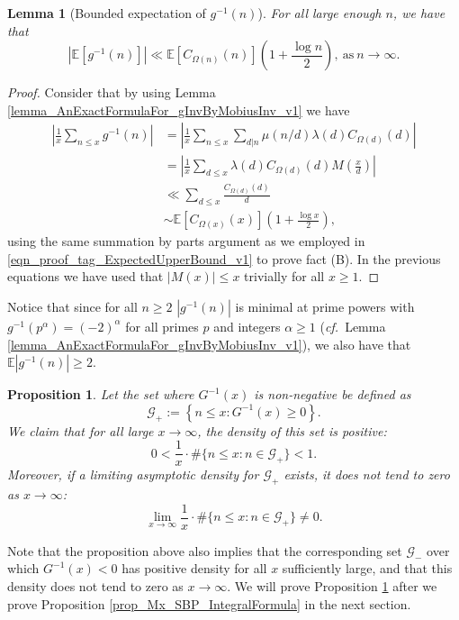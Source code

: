 \documentclass[11pt,reqno,a4letter]{article}
\numberwithin{figure}{section}
\numberwithin{table}{section}
\newcommand{\cf}{\textit{cf.\ }}
\theoremstyle{plain}
\newtheorem{prop}[theorem]{Proposition}
\newtheorem{lemma}[theorem]{Lemma}
\numberwithin{theorem}{section}
\theoremstyle{definition}
\begin{document}
\begin{lemma}[Bounded expectation of $g^{-1}(n)$] 
\label{lemma_BddExpectationOfgInvn} 
For all large enough $n$, we have that 
\[
|\mathbb{E}[g^{-1}(n)]| \ll \mathbb{E}[C_{\Omega(n)}(n)] \left( 
     1 + \frac{\log n}{2} 
     \right), \mathrm{\ as\ } n \rightarrow \infty. 
\]
\end{lemma}
\begin{proof} 
Consider that by using Lemma \ref{lemma_AnExactFormulaFor_gInvByMobiusInv_v1} we have 
\begin{align*} 
\left\lvert \frac{1}{x} \sum_{n \leq x} g^{-1}(n) \right\rvert 
     & = \left\lvert \frac{1}{x} \sum_{n \leq x} \sum_{d|n} \mu(n/d) \lambda(d) C_{\Omega(d)}(d) \right\rvert \\ 
     & = \left\lvert \frac{1}{x} \sum_{d \leq x} \lambda(d) C_{\Omega(d)}(d) M\left(\frac{x}{d}\right) \right\rvert \\ 
     & \ll \sum_{d \leq x} \frac{C_{\Omega(d)}(d)}{d} \\ 
     & \sim \mathbb{E}\left[C_{\Omega(x)}(x)\right] \left( 
     1 + \frac{\log x}{2} 
     \right),  
\end{align*} 
using the same summation by parts argument as we employed in 
\eqref{eqn_proof_tag_ExpectedUpperBound_v1} to prove fact (B). 
In the previous equations we have used that 
$|M(x)| \leq x$ trivially for all $x \geq 1$. 
\end{proof} 

Notice that since for all $n \geq 2$ 
$|g^{-1}(n)|$ is minimal at prime powers with $g^{-1}(p^{\alpha}) = (-2)^{\alpha}$ 
for all primes $p$ and integers $\alpha \geq 1$ 
(\cf Lemma \ref{lemma_AnExactFormulaFor_gInvByMobiusInv_v1}), 
we also have that 
$\mathbb{E}|g^{-1}(n)| \geq 2$. 

\begin{prop} 
\label{prop_DensityOfGInvxPosAndBdd} 
Let the set where $G^{-1}(x)$ is non-negative be defined as 
\[
\mathcal{G}_{+} := \left\{n \leq x: G^{-1}(x) \geq 0\right\}. 
\]
We claim that for all large $x \rightarrow \infty$, the density of this set is 
positive: 
\[
0 < \frac{1}{x} \cdot \#\{n \leq x: n \in \mathcal{G}_{+}\} < 1. 
\]
Moreover, if a limiting asymptotic density for $\mathcal{G}_{+}$ exists, it does not 
tend to zero as $x \rightarrow \infty$: 
\[
\lim_{x \rightarrow \infty} \frac{1}{x} \cdot \#\{n \leq x: n \in \mathcal{G}_{+}\} \neq 0. 
\]
\end{prop} 

Note that the proposition above also implies that the corresponding set $\mathcal{G}_{-}$ over which 
$G^{-1}(x) < 0$ has positive density for all $x$ sufficiently large, and that this density does not 
tend to zero as $x \rightarrow \infty$. 
We will prove Proposition \ref{prop_DensityOfGInvxPosAndBdd} after we prove 
Proposition \ref{prop_Mx_SBP_IntegralFormula} in the next section. 
\end{document}

